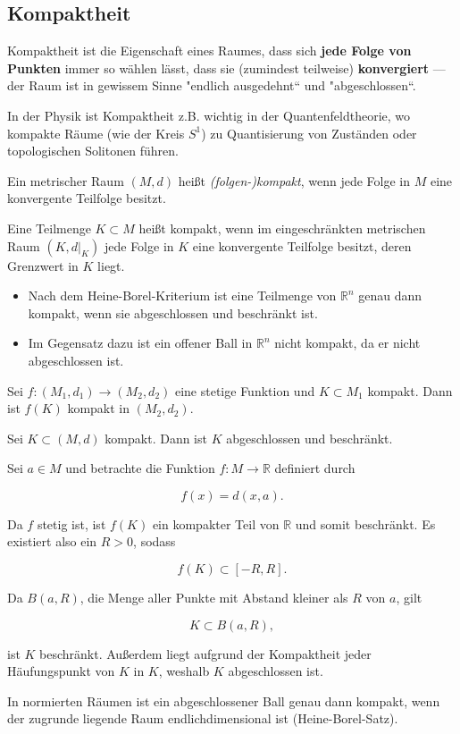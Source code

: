\subsection{Kompaktheit}

Kompaktheit ist die Eigenschaft eines Raumes, dass sich \textbf{jede Folge von Punkten} immer so wählen lässt, dass sie (zumindest teilweise) \textbf{konvergiert} — der Raum ist in gewissem Sinne "endlich ausgedehnt“ und "abgeschlossen“.

In der Physik ist Kompaktheit z.B. wichtig in der Quantenfeldtheorie, wo kompakte Räume (wie der Kreis $S^1$) zu Quantisierung von Zuständen oder topologischen Solitonen führen.


\begin{definition}{}
Ein metrischer Raum $(M,d)$ heißt \emph{(folgen-)kompakt}, wenn jede Folge in $M$ eine konvergente Teilfolge besitzt.
\end{definition}

\begin{definition}{}
Eine Teilmenge $K \subset M$ heißt kompakt, wenn im eingeschränkten metrischen Raum $(K, d|_K)$ jede Folge in $K$ eine konvergente Teilfolge besitzt, deren Grenzwert in $K$ liegt.
\end{definition}

\begin{beispielbox}
\begin{itemize}
  \item Nach dem Heine-Borel-Kriterium ist eine Teilmenge von $\mathbb{R}^n$ genau dann kompakt, wenn sie abgeschlossen und beschränkt ist.
  \item Im Gegensatz dazu ist ein offener Ball in $\mathbb{R}^n$ nicht kompakt, da er nicht abgeschlossen ist.
\end{itemize}
\end{beispielbox}

\begin{satz}{}
    Sei $f: (M_1,d_1) \to (M_2,d_2)$ eine stetige Funktion und $K \subset M_1$ kompakt. Dann ist $f(K)$ kompakt in $(M_2,d_2)$.
\end{satz}


\begin{satz}{}
    Sei $K \subset (M,d)$ kompakt. Dann ist $K$ abgeschlossen und beschränkt.
\end{satz}

\begin{beweisbox}
Sei $a \in M$ und betrachte die Funktion $f: M \to \mathbb{R}$ definiert durch


\[
f(x) = d(x,a).
\]


Da $f$ stetig ist, ist $f(K)$ ein kompakter Teil von $\mathbb{R}$ und somit beschränkt. Es existiert also ein $R > 0$, sodass


\[
f(K) \subset [-R, R].
\]


Da $B(a, R)$, die Menge aller Punkte mit Abstand kleiner als $R$ von $a$, gilt


\[
K \subset B(a,R),
\]


ist $K$ beschränkt. Außerdem liegt aufgrund der Kompaktheit jeder Häufungspunkt von $K$ in $K$, weshalb $K$ abgeschlossen ist.
\end{beweisbox}

\begin{bemerkungbox}
In normierten Räumen ist ein abgeschlossener Ball genau dann kompakt, wenn der zugrunde liegende Raum endlichdimensional ist (Heine-Borel-Satz).
\end{bemerkungbox}
